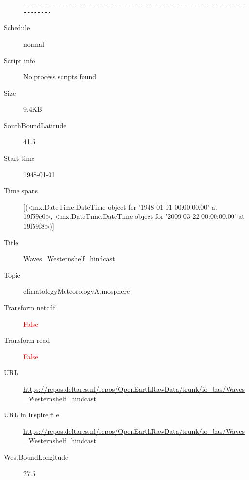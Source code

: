 \documentclass[9]{report}
\begin{document}
\begin{description}
\begin{verbatim}
------------------------------------------------------------------------

\end{verbatim}
  \item[Schedule] normal
  \item[Script info] No process scripts found
  \item[Size] 9.4KB
  \item[SouthBoundLatitude] 41.5
  \item[Start time] 1948-01-01
  \item[Time spans] [(<mx.DateTime.DateTime object for '1948-01-01 00:00:00.00' at 19f59c0>, <mx.DateTime.DateTime object for '2009-03-22 00:00:00.00' at 19f59f8>)]
  \item[Title]  Waves\_Westernshelf\_hindcast 
  \item[Topic] climatologyMeteorologyAtmosphere
  \item[Transform netcdf] \textcolor{red}{False}
  \item[Transform read] \textcolor{red}{False}
  \item[URL] \href{https://repos.deltares.nl/repos/OpenEarthRawData/trunk/io\_bas/Waves\_Westernshelf\_hindcast}{https://repos.deltares.nl/repos/OpenEarthRawData/trunk/io\_bas/Waves\_Westernshelf\_hindcast}
  \item[URL in inspire file] \href{https://repos.deltares.nl/repos/OpenEarthRawData/trunk/io\_bas/Waves\_Westernshelf\_hindcast}{https://repos.deltares.nl/repos/OpenEarthRawData/trunk/io\_bas/Waves\_Westernshelf\_hindcast}
  \item[WestBoundLongitude] 27.5
\end{description}
\end{document}
